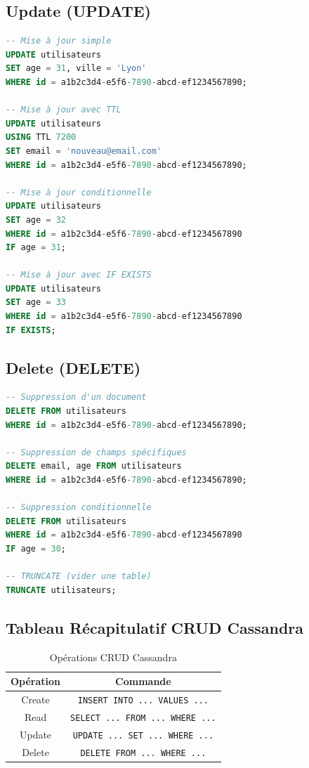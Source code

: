 \documentclass[11pt,a4paper]{article}
\begin{document}
\subsection{Update (UPDATE)}

\begin{lstlisting}[language=SQL]
-- Mise à jour simple
UPDATE utilisateurs
SET age = 31, ville = 'Lyon'
WHERE id = a1b2c3d4-e5f6-7890-abcd-ef1234567890;

-- Mise à jour avec TTL
UPDATE utilisateurs
USING TTL 7200
SET email = 'nouveau@email.com'
WHERE id = a1b2c3d4-e5f6-7890-abcd-ef1234567890;

-- Mise à jour conditionnelle
UPDATE utilisateurs
SET age = 32
WHERE id = a1b2c3d4-e5f6-7890-abcd-ef1234567890
IF age = 31;

-- Mise à jour avec IF EXISTS
UPDATE utilisateurs
SET age = 33
WHERE id = a1b2c3d4-e5f6-7890-abcd-ef1234567890
IF EXISTS;
\end{lstlisting}

\subsection{Delete (DELETE)}

\begin{lstlisting}[language=SQL]
-- Suppression d'un document
DELETE FROM utilisateurs
WHERE id = a1b2c3d4-e5f6-7890-abcd-ef1234567890;

-- Suppression de champs spécifiques
DELETE email, age FROM utilisateurs
WHERE id = a1b2c3d4-e5f6-7890-abcd-ef1234567890;

-- Suppression conditionnelle
DELETE FROM utilisateurs
WHERE id = a1b2c3d4-e5f6-7890-abcd-ef1234567890
IF age = 30;

-- TRUNCATE (vider une table)
TRUNCATE utilisateurs;
\end{lstlisting}

\subsection{Tableau Récapitulatif CRUD Cassandra}

\begin{table}[h]
\centering
\begin{tabular}{|c|c|}
\hline
\textbf{Opération} & \textbf{Commande} \\
\hline
Create & \texttt{INSERT INTO ... VALUES ...} \\
\hline
Read & \texttt{SELECT ... FROM ... WHERE ...} \\
\hline
Update & \texttt{UPDATE ... SET ... WHERE ...} \\
\hline
Delete & \texttt{DELETE FROM ... WHERE ...} \\
\hline
\end{tabular}
\caption{Opérations CRUD Cassandra}
\end{table}
\end{document}
